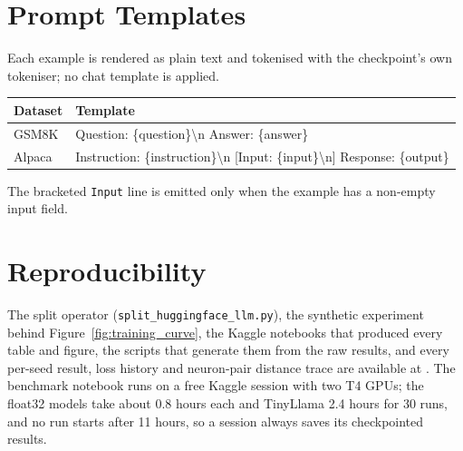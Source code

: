 \section{Prompt Templates}
\label{app:prompts}
Each example is rendered as plain text and tokenised with the checkpoint's own tokeniser; no chat template is applied.
\begin{center}\small
\begin{tabular}{@{}l>{\ttfamily}p{}@{}}
\toprule
\textbf{Dataset} & \textrm{\textbf{Template}} \\
\midrule
GSM8K & Question: \{question\}\textbackslash n Answer: \{answer\} \\
Alpaca & Instruction: \{instruction\}\textbackslash n [Input: \{input\}\textbackslash n] Response: \{output\} \\
\bottomrule
\end{tabular}
\end{center}
The bracketed \texttt{Input} line is emitted only when the example has a non-empty input field.

\section{Reproducibility}
\label{app:repro}
The split operator (\texttt{split\_huggingface\_llm.py}), the synthetic experiment behind Figure~\ref{fig:training_curve}, the Kaggle notebooks that produced every table and figure, the scripts that generate them from the raw results, and every per-seed result, loss history and neuron-pair distance trace are available at \repourl. The benchmark notebook runs on a free Kaggle session with two T4 GPUs; the float32 models take about 0.8 hours each and TinyLlama 2.4 hours for 30 runs, and no run starts after 11 hours, so a session always saves its checkpointed results.
